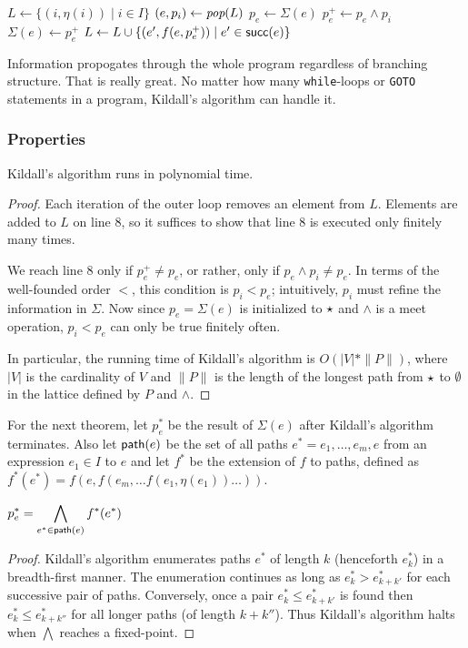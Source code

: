 \documentclass{article}
\begin{document}
\begin{algorithmic}[1]
\STATE $L \leftarrow \{(i, \eta(i)) \mid i \in I\}$
  \STATE $(e, p_i) \leftarrow \emph{pop}(L)$
  \STATE $p_e \leftarrow \Sigma(e)$
  \STATE $p_{e}^+ \leftarrow p_e \wedge p_i$
    \STATE $\Sigma(e) \leftarrow p_e^+$
    \STATE $L \leftarrow L \cup \{(e', f(e, p_{e}^+)) \mid e' \in \mathsf{succ}(e) \}$
  \ENDIF
\ENDWHILE
\end{algorithmic}

Information propogates through the whole program regardless of branching structure.
That is really great.
No matter how many {\tt while}-loops or {\tt GOTO} statements in a program, Kildall's algorithm can handle it.


\subsubsection*{Properties}
\label{properties}

\begin{t1}
Kildall's algorithm runs in polynomial time.
\end{t1}
\begin{proof}
Each iteration of the outer loop removes an element from $L$.
Elements are added to $L$ on line 8, so it suffices to show that line 8 is executed only finitely many times.

We reach line 8 only if $p_{e}^+ \neq p_e$, or rather, only if $p_e \wedge p_i \neq p_e$.
In terms of the well-founded order $<$, this condition is $p_i < p_e$; intuitively, $p_i$ must refine the information in $\Sigma$.
Now since $p_e = \Sigma(e)$ is initialized to $\star$ and $\wedge$ is a meet operation, $p_i < p_e$ can only be true finitely often.

In particular, the running time of Kildall's algorithm is $O(|V| * \|P\|)$, where $|V|$ is the cardinality of $V$ and $\|P\|$ is the length of the longest path from $\star$ to $\emptyset$ in the lattice defined by $P$ and $\wedge$.
\end{proof}

For the next theorem, let $p_e^*$ be the result of $\Sigma(e)$ after Kildall's algorithm terminates.
Also let $\mathsf{path}(e)$ be the set of all paths $e^* = e_1, \ldots, e_m, e$ from an expression $e_1 \in I$ to $e$ and let $f^*$ be the extension of $f$ to paths, defined as $f^*(e^*) = f(e, f(e_m, \ldots f(e_1, \eta(e_1)) \ldots))$.
\begin{t2}
  $\displaystyle p_e^* = \bigwedge_{e^* \in \mathsf{path}(e)} f^*(e^*)$
\end{t2}
\begin{proof}
Kildall's algorithm enumerates paths $e^*$ of length $k$ (henceforth $e^*_k$) in a breadth-first manner.
The enumeration continues as long as $e^*_k > e^*_{k+k'}$ for each successive pair of paths.
Conversely, once a pair $e^*_k \leq e^*_{k+k'}$ is found then $e^*_k \leq e^*_{k+k''}$ for all longer paths (of length $k + k''$).
Thus Kildall's algorithm halts when $\bigwedge$ reaches a fixed-point.
\end{proof}
\end{document}
